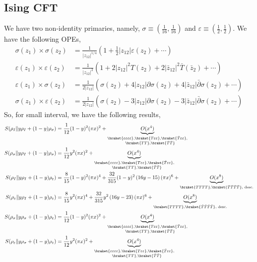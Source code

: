 \documentclass[11pt]{article}
\newcommand{\p}{\partial}
\newcommand{\lb}{\left(}
\newcommand{\rb}{\right)}
\begin{document}
\subsection{Ising CFT}
We have two non-identity primaries, namely, $\sigma \equiv
 \lb \frac{1}{16}, \frac{1}{16}\rb$ and $\varepsilon\equiv \lb \frac{1}{2},\frac{1}{2}\rb$. 
We have the following OPEs,
\begin{align}
    \sigma(z_1)\times \sigma(z_2) &= \frac{1}{|z_{12}|^{1/4}}\lb 1+ \frac{1}{2} |z_{12}| \varepsilon(z_{2}) + \cdots \rb \\
    \varepsilon(z_1) \times \varepsilon(z_2) &= \frac{1}{|z_{12}|^2} \lb 1+ 2|z_{12}|^2 T(z_{2}) + 2|\bar{z}_{12}|^2\bar{T}(\bar{z}_{2})  + \cdots\rb \\
    \varepsilon(z_1) \times \sigma(z_2) &= \frac{1}{2|z_{12}|}\lb \sigma(z_2) + 4|z_{12}| \p \sigma(z_2) + 4|\bar{z}_{12}|\bar{\p}\sigma  (z_2) + \cdots \rb \\
    \sigma(z_1) \times \varepsilon(z_2) &= \frac{1}{2|z_{12}|}\lb \sigma(z_2) -3|z_{12}| \p \sigma(z_2) -3|\bar{z}_{12}|\bar{\p}\sigma  (z_2) + \cdots \rb 
\end{align}
So, for small interval, we have the following results,
\begin{align}
    S(\rho_I \| y \rho_I + (1-y)\rho_\sigma) &= \frac{1}{12} (1-y)^2(\pi x)^2+\underbrace{O(x^{4})}_{\substack {\braket{\varepsilon\varepsilon\varepsilon\varepsilon} ,\braket{T\varepsilon\varepsilon}, \braket{\bar T \varepsilon\varepsilon},\\ \quad \braket{TT},\braket{\bar T \bar T}}}\\
    S(\rho_\sigma \| y \rho_I + (1-y)\rho_\sigma) &= \frac{1}{12} y^2(\pi x)^2+\underbrace{O(x^{4})}_{\substack {\braket{\varepsilon\varepsilon\varepsilon\varepsilon} ,\braket{T\varepsilon\varepsilon}, \braket{\bar T \varepsilon\varepsilon},\\ \quad \braket{TT},\braket{\bar T \bar T}}} \\ 
    S(\rho_I \| y \rho_I + (1-y)\rho_\varepsilon) &= \frac{8}{15} (1-y)^2 (\pi x)^4+\frac{32}{315}(1-y)^2\lb16y - 15\rb (\pi x)^6 + \underbrace{O(x^8)}_{\braket{TTTT},\braket{\bar T\bar T\bar T\bar T}, \text{ desc.}} \\
    S(\rho_\varepsilon \| y \rho_I + (1-y)\rho_\varepsilon) &= \frac{8}{15} y^2 (\pi x)^4 +\frac{32}{315}y^2\lb16y - 23\rb (\pi x)^6 +\underbrace{O(x^8)}_{\braket{TTTT},\braket{\bar T\bar T\bar T\bar T}, \text{ desc.}}\\
    S(\rho_\sigma \| y \rho_\sigma + (1-y)\rho_\varepsilon) &= \frac{1}{12} (1-y)^2(\pi x)^2+\underbrace{O(x^{4})}_{\substack {\braket{\varepsilon\varepsilon\varepsilon\varepsilon} ,\braket{T\varepsilon\varepsilon}, \braket{\bar T \varepsilon\varepsilon},\\ \quad \braket{TT},\braket{\bar T \bar T}}} \\
    S(\rho_\varepsilon \| y \rho_\sigma + (1-y)\rho_\varepsilon) &= \frac{1}{12} y^2(\pi x)^2+\underbrace{O(x^{4})}_{\substack {\braket{\varepsilon\varepsilon\varepsilon\varepsilon} ,\braket{T\varepsilon\varepsilon}, \braket{\bar T \varepsilon\varepsilon},\\ \quad \braket{TT},\braket{\bar T \bar T}}}
\end{align}
\end{document}
